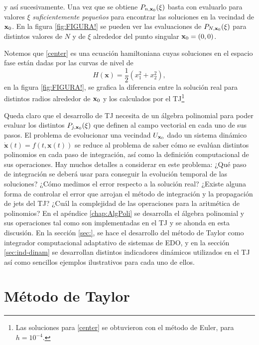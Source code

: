 y así sucesivamente. Una vez que se obtiene $P_{n,\mathbf{x}_0}(\xi)$ basta con evaluarlo para valores $\mathbb{\xi}$ \textit{suficientemente pequeños} para encontrar las soluciones en la vecindad de $\mathbf{x}_0$. En la figura \ref{fig:FIGURA!} se pueden ver las evaluaciones de $P_{N,\mathbf{x}_0}(\xi)$ para distintos valores de $N$ y de $\xi$ alrededor del punto singular $\mathbf{x}_0 = (0,0)$.


Notemos que \ref{center} es una ecuación hamiltoniana cuyas soluciones en el espacio fase están dadas por las curvas de nivel de
\begin{equation*}
H(\mathbf{x}) = \frac{1}{2} \left( x_1^2 + x_2^2 \right),
\end{equation*} 
en la figura \ref{fig:FIGURA!}, se grafica la diferencia entre la solución real para distintos radios alrededor de $\mathbf{x}_0$ y los calculados por el TJ\footnote{Las soluciones para \ref{center} se obtuvieron con el método de Euler, para $h=10^{-4}$.}


Queda claro que el desarrollo de TJ necesita de un álgebra polinomial para poder evaluar los distintos $P_{j,\mathbf{x}_0}(\xi)$ que definen al campo vectorial en cada uno de sus pasos. El problema de evolucionar una vecindad $U_{\mathbf{x}_0}$ dado un sistema dinámico $\dot{\mathbf{x}}(t) = f(t,\mathbf{x}(t))$ se reduce al problema de saber cómo se evalúan distintos polinomios en cada paso de integración, así como la definición computacional de sus operaciones. Hay muchos detalles a considerar en este problema: ¿Qué paso de integración se deberá usar para conseguir la evolución temporal de las soluciones? ¿Cómo medimos el error respecto a la solución real? ¿Existe alguna forma de controlar el error que arrojan el método de integración y la propagación de jets del TJ? ¿Cuál la complejidad de las operaciones para la aritmética de polinomios? En el apéndice \ref{chap:AlgPoli} se desarrolla el álgebra polinomial y sus operaciones tal como son implementadas en el TJ y se ahonda en esta discusión. En la sección \ref{sec:}, se hace el desarrollo del método de Taylor como integrador computacional adaptativo de sistemas de EDO, y en la sección \ref{sec:ind-dinam} se desarrollan distintos indicadores dinámicos utilizados en el TJ así como sencillos ejemplos ilustrativos para cada uno de ellos.

\section{Método de Taylor}

